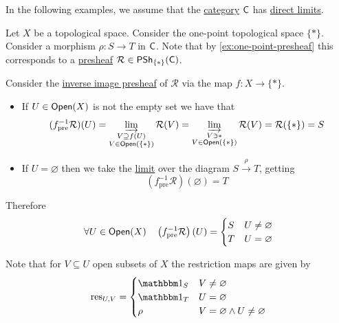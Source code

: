 \documentclass[../../../main]{subfiles}
\begin{document}
In the following examples, we assume that the \hyperref[def:category]{category} \(\mathsf{C}\) has \hyperref[def:direct-limit]{direct limits}.
\begin{example} \label{ex:constant-presheaf}
  Let \(X\) be a topological space.
  Consider the one-point topological space \(\{\ast\}\).
  Consider a morphism \(\rho: S \to T\) in \(\mathsf{C}\).
  Note that by \autoref{ex:one-point-presheaf} this corresponds to a \hyperref[def:presheaf]{presheaf} \(\mathcal{R} \in \mathsf{PSh}_{\{\ast\}}(\mathsf{C})\).

  Consider the \hyperref[def:inverse-image-presheaf]{inverse image presheaf} of \(\mathcal{R}\) via the map \(f: X \to \{\ast\}\).
  \begin{itemize}
    \item If \(U \in \mathsf{Open}(X)\) is not the empty set we have that
          \begin{align*}
            (f_{\operatorname{pre}}^{-1}\mathcal{R})(U) = \varinjlim_{\substack{V \supseteq f(U) \\ V \in \mathsf{Open}(\{\ast\})}} \mathcal{R}(V) = \varinjlim_{\substack{V \ni \ast \\ V \in \mathsf{Open}(\{\ast\})}} \mathcal{R}(V) = \mathcal{R}(\{\ast\}) = S
          \end{align*}
    \item If \(U = \varnothing\) then we take the \hyperref[def:categorical-limit]{limit} over the diagram \(S \xrightarrow{\rho} T\), getting
          \begin{equation*}
            (f_{\operatorname{pre}}^{-1}\mathcal{R})(\varnothing) = T
          \end{equation*}
  \end{itemize}
  Therefore
  \begin{equation*}
    \forall U \in \mathsf{Open}(X) \quad \left( f_{\operatorname{pre}}^{-1}\mathcal{R} \right)(U) = \begin{cases}
      S & U \neq \varnothing \\
      T & U = \varnothing
    \end{cases}
  \end{equation*}

  Note that for \(V \subseteq U\) open subsets of \(X\) the restriction maps are given by
  \begin{align*}
    \res_{U, V} = \begin{cases}
      \id_{S} & V \neq \varnothing \\
      \id_{T} & U = \varnothing \\
      \rho & V = \varnothing \land U \neq \varnothing
    \end{cases}
  \end{align*}



\end{example}
\end{document}
